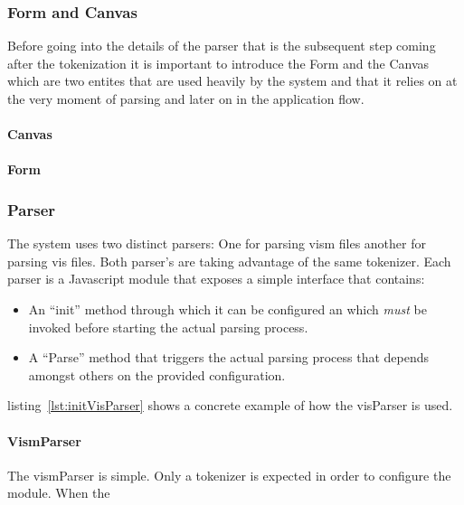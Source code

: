 

\subsubsection{Form and Canvas}

Before going into the details of the parser that is the subsequent step coming after the tokenization it is important to introduce the Form and the Canvas which are two entites that are used heavily by the system and that it relies on at the very moment of parsing and later on in the application flow.

\paragraph{Canvas}
\label{sec:Canvas}

\paragraph{Form}
\label{sec:Form}

\subsubsection{Parser}
\label{sec:Parser}

The system uses two distinct parsers: One for parsing vism files another for parsing vis files. Both parser's are taking advantage of the same tokenizer. Each parser is a Javascript module that exposes a simple interface that contains:
\begin{itemize}
    \item An ``init'' method through which it can be configured an which \emph{must} be invoked before starting the actual parsing process.
    \item A ``Parse'' method that triggers the actual parsing process that depends amongst others on the provided configuration.
\end{itemize}



listing~\ref{lst:initVisParser} shows a concrete example of how the visParser is used.

\paragraph{VismParser}
\label{sec:VismParser}
The vismParser is simple. Only a tokenizer is expected in order to configure the module. When the  

